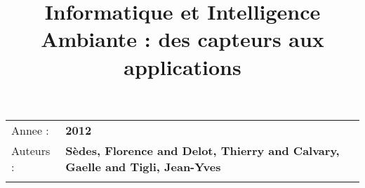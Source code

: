 \documentclass[10pt]{article}
\begin{document}
\title{Informatique et Intelligence Ambiante : des capteurs aux applications}
\maketitle

\begin{longtable}[c]{@{}ll@{}}
\toprule\addlinespace

Annee : & \textbf{2012}
\\\addlinespace

Auteurs : & \textbf{Sèdes, Florence and Delot, Thierry and Calvary, Gaelle and Tigli, Jean-Yves}
\\\addlinespace

\bottomrule
\end{longtable}
\end{document}
